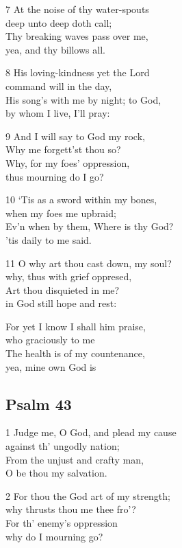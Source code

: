 \begin{multicols}{3}
7 At the noise of thy water-spouts\\
deep unto deep doth call;\\
Thy breaking waves pass over me,\\
yea, and thy billows all.

8 His loving-kindness yet the Lord\\
command will in the day,\\
His song’s with me by night; to God,\\
by whom I live, I’ll pray:

9 And I will say to God my rock,\\
Why me forgett’st thou so?\\
Why, for my foes’ oppression,\\
thus mourning do I go?

10 ‘Tis as a sword within my bones,\\
when my foes me upbraid;\\
Ev’n when by them, Where is thy God?\\
’tis daily to me said.

11 O why art thou cast down, my soul?\\
why, thus with grief oppresed,\\
Art thou disquieted in me?\\
in God still hope and rest:

For yet I know I shall him praise,\\
who graciously to me\\
The health is of my countenance,\\
yea, mine own God is 

\begin{center}
\quad{}\quad{}
\end{center}

\subsection*{Psalm 43}

1 Judge me, O God, and plead my cause\\
against th’ ungodly nation;\\
From the unjust and crafty man,\\
O be thou my salvation.

2 For thou the God art of my strength;\\
why thrusts thou me thee fro’?\\
For th’ enemy’s oppression\\
why do I mourning go?


\end{multicols}
